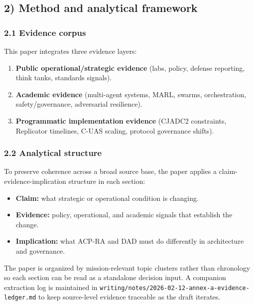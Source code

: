 \documentclass[11pt]{article}
\begin{document}
\hypertarget{method-and-analytical-framework}{%
\subsection{2) Method and analytical
framework}\label{method-and-analytical-framework}}

\hypertarget{evidence-corpus}{%
\subsubsection{2.1 Evidence corpus}\label{evidence-corpus}}

This paper integrates three evidence layers:

\begin{enumerate}
\def\labelenumi{\arabic{enumi}.}
\tightlist
\item
  \textbf{Public operational/strategic evidence} (labs, policy, defense
  reporting, think tanks, standards signals).
\item
  \textbf{Academic evidence} (multi-agent systems, MARL, swarms,
  orchestration, safety/governance, adversarial resilience).
\item
  \textbf{Programmatic implementation evidence} (CJADC2 constraints,
  Replicator timelines, C-UAS scaling, protocol governance shifts).
\end{enumerate}

\hypertarget{analytical-structure}{%
\subsubsection{2.2 Analytical structure}\label{analytical-structure}}

To preserve coherence across a broad source base, the paper applies a
claim-evidence-implication structure in each section:

\begin{itemize}
\tightlist
\item
  \textbf{Claim:} what strategic or operational condition is changing.
\item
  \textbf{Evidence:} policy, operational, and academic signals that
  establish the change.
\item
  \textbf{Implication:} what ACP-RA and DAD must do differently in
  architecture and governance.
\end{itemize}

The paper is organized by mission-relevant topic clusters rather than
chronology so each section can be read as a standalone decision input. A
companion extraction log is maintained in
\texttt{writing/notes/2026-02-12-annex-a-evidence-ledger.md} to keep
source-level evidence traceable as the draft iterates.
\end{document}
